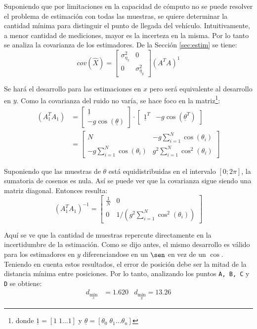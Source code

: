
	Suponiendo que por limitaciones en la capacidad de cómputo no se puede resolver el problema de estimación con todas las muestras, se quiere determinar la cantidad mínima para distinguir el punto de llegada del vehículo. Intuitivamente, a menor cantidad de mediciones, mayor es la incerteza en la misma. Por lo tanto se analiza la covarianza de los estimadores. De la Sección \ref{sec:estim} se tiene:
	\begin{equation*}
		cov(\hat{X}) = \begin{bmatrix} \sigma^2_{\eta_x} & 0 \\[0.3em] 0 & \sigma^2_{\eta_y} \end{bmatrix} (A^T A)^{1}
	\end{equation*}

	Se hará el desarrollo para las estimaciones en $x$ pero será equivalente al desarrollo en $y$. Como la covarianza del ruido no varía, se hace foco en la matriz\footnote{donde $\underline{1}=[1 \; 1 \hdots 1]$ y $\underline{\theta}=[\theta_0\; \theta_1 \hdots \theta_n]$}:
	\begin{align*}
		(A^T_1 A_1) &= \begin{bmatrix} \underline{1} \\ -g\cos(\underline{\theta}) \end{bmatrix} \cdot \begin{bmatrix} \underline{1}^T & -g\cos(\underline{\theta}^T) \end{bmatrix}\\
					       &= \begin{bmatrix} N & -g\sum^N_{i=1}\cos(\theta_i) \\[0.7em] -g\sum^N_{i=1} \cos(\theta_i) & g^2\sum^N_{i=1} \cos^2(\theta_i) \end{bmatrix}
	\end{align*}

	Suponiendo que las muestras de $\theta$ está equidistribuidas en el intervalo $[0;2\pi]$, la sumatoria de cosenos es nula. Así se puede ver que la covarianza sigue siendo una matriz diagonal. Entonces resulta:
	\begin{equation*}
	(A^T_1 A_1)^{-1} = \begin{bmatrix} \frac{1}{N} & 0 \\[0.7em] 0 & 1/\left(g^2\sum^N_{i=1} \cos^2(\theta_i)\right) \end{bmatrix}
	\end{equation*}

	Aquí se ve que la cantidad de muestras repercute directamente en la incertidumbre de la estimación. Como se dijo antes, el mismo desarrollo es válido para los estimadores en $y$ diferenciandose en un $\sen$ en vez de un $\cos$. Teniendo en cuenta estos resultados, el error de posición debe ser la mitad de la distancia mínima entre posiciones. Por lo tanto, analizando los puntos \texttt{A, B, C} y \texttt{D} se obtiene:
	\begin{align*}
		d_{\min_x} &= \num{1.620}  &d_{\min_y} = \num{13.26}
	\end{align*}
	

